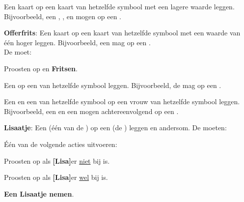 \newpage
{}

\label{sec:zettenLang}


    \item Een kaart op een kaart van hetzelfde symbool met een lagere waarde leggen. Bijvoorbeeld, een , ,  en  mogen op een .
\eindLijst{}

\vervolgLijst{}
    \item \textbf{Offerfrits}: Een kaart op een kaart van hetzelfde symbool met een waarde van \'e\'en hoger leggen. Bijvoorbeeld, een  mag op een . \\De \huidigeSpeler moet:
    \puntLijst{}
        \item Proosten op  en \textbf{Fritsen}.
    \eindPuntLijst{}
    \label{zet:offer_frits}
\eindLijst{}

\vervolgLijst{}
    \item Een  op een  van hetzelfde symbool leggen. Bijvoorbeeld, de  mag op een .
\eindLijst{}


\vervolgLijst{}
    \item \label{zet:dubbel} Een  en een  van hetzelfde symbool op een vrouw van hetzelfde symbool leggen. Bijvoorbeeld, een  en een  mogen achtereenvolgend op een .
\eindLijst{}

\vervolgLijst{}
    \item \label{zet:lisa} \textbf{Lisaatje}: Een  (\'e\'en van de ) op een  (de ) leggen en andersom. De \andereSpelers moeten:
     \puntLijst{}
        \item Één van de volgende acties uitvoeren:
        \numeriekeLijst{}
            \item Proosten op  als \textbf{[Lisa]}\footnotemark[1] er \ul{niet} bij is.
            \item Proosten op  als \textbf{[Lisa]}\footnotemark[1] er \ul{wel} bij is.
        \eindNumeriekeLijst{}
        \item \textbf{Een Lisaatje nemen}\footnotemark[2].
    \eindPuntLijst{}
\eindLijst{}

